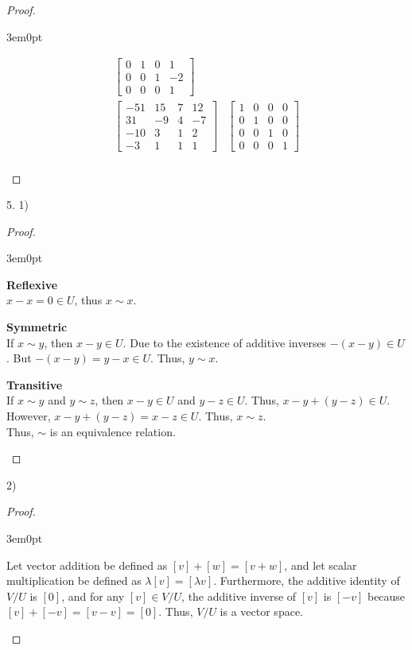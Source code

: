 \documentclass[11pt]{article}
\newenvironment{myproof}
{\begin{proof} \begin{adjustwidth}{3em}{0pt}$ $\par\nobreak\ignorespaces}
{\end{adjustwidth} \end{proof}}
\begin{document}
\begin{flushleft}
\begin{myproof}
\begin{align*}
\begin{bmatrix}
0 & 1 & 0 & 1 \\
0 & 0 & 1 & -2 \\
0 & 0 & 0 & 1
\end{bmatrix} \\
\begin{bmatrix}
-51 & 15 & 7 & 12 \\
31 & -9 & 4 & -7 \\
-10 & 3 & 1 & 2 \\
-3 & 1 & 1 & 1
\end{bmatrix}
&\begin{bmatrix}
1 & 0 & 0 & 0 \\
0 & 1 & 0 & 0 \\
0 & 0 & 1 & 0 \\
0 & 0 & 0 & 1
\end{bmatrix} \\
\end{align*}

\end{myproof}

\newpage

5. 1)

\begin{myproof}

\textbf{Reflexive} \\
$x -x = 0 \in U$, thus $x \sim x$. \\
\bigskip

\textbf{Symmetric} \\
If $x \sim y$, then $x - y \in U$. Due to the existence of additive inverses $-(x-y) \in U$. But $-(x-y) = y - x \in U$. Thus, $y \sim x$. \\
\bigskip

\textbf{Transitive} \\
If $x \sim y$ and $y \sim z$, then $x - y \in U$ and $y - z \in U$. Thus, $x-y + (y-z) \in U$. However, $x-y + (y-z) = x-z \in U$. Thus, $x \sim z$. \\
\bigskip
Thus, $\sim$ is an equivalence relation.

\end{myproof}

2)

\begin{myproof}

Let vector addition be defined as $[v] + [w] = [v+w]$, and let scalar multiplication be defined as $\lambda [v] = [\lambda v]$. Furthermore, the additive identity of $V/U$ is $[0]$, and for any $[v] \in V/U$, the additive inverse of $[v]$ is $[-v]$ because $[v] + [-v] = [v-v] = [0]$. Thus, $V/U$ is a vector space.


\end{myproof}
\end{flushleft}
\end{document}
